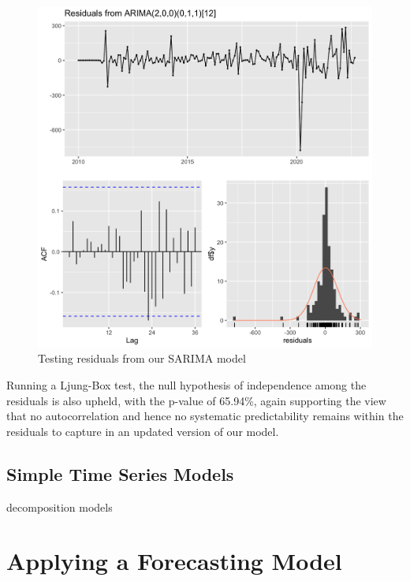 \documentclass[9pt,technote]{IEEEtran}
\begin{document}
\begin{figure}[htbp]
\centerline{\includegraphics[scale=0.25]{SARIMA_residuals.png}}
\caption{Testing residuals from our SARIMA model}
\label{fig:SARIMA_residuals}
\end{figure}

Running a Ljung-Box test, the null hypothesis of independence among the residuals is also upheld, with the p-value of 65.94\%, again supporting the view that no autocorrelation and hence no systematic predictability remains within the residuals to capture in an updated version of our model.  


\subsection{Simple Time Series Models}

decomposition models

\section{Applying a Forecasting Model}
\end{document}
